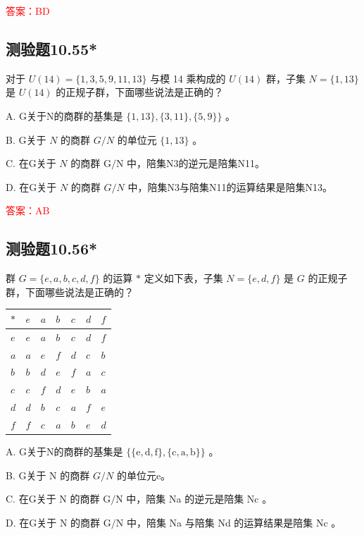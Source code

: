 \documentclass[UTF8, heading=true]{ctexart}
\begin{document}
\textcolor{red}{答案：BD}


\subsection{测验题10.55*}

对于 $U(14)=\{1,3,5,9,11,13\}$ 与模 14 乘构成的 $U(14)$ 群，子集 $N=\{1,13\}$ 是 $U(14)$ 的正规子群，下面哪些说法是正确的？

A. G关于N的商群的基集是 $\{1,13\},\{3,11\},\{5,9\}\}$ 。

B. G关于 $N$ 的商群 $G / N$ 的单位元 $\{1,13\}$ 。

C. 在G关于 $N$ 的商群 $\mathrm{G} / \mathrm{N}$ 中，陪集N3的逆元是陪集N11。

D. 在G关于 $N$ 的商群 $G / N$ 中，陪集N3与陪集N11的运算结果是陪集N13。

\textcolor{red}{答案：AB}

\subsection{测验题10.56*}

群 $G=\{e, a, b, c, d, f\}$ 的运算 $*$ 定义如下表，子集 $N=\{e, d, f\}$ 是 $G$ 的正规子群，下面哪些说法是正确的？

\begin{table}[H]
  \renewcommand{\arraystretch}{1.5}
  \centering
\begin{tabular}{l|llllll}
\hline$*$ & $e$ & $a$ & $b$ & $c$ & $d$ & $f$ \\
\hline$e$ & $e$ & $a$ & $b$ & $c$ & $d$ & $f$ \\
$a$ & $a$ & $e$ & $f$ & $d$ & $c$ & $b$ \\
$b$ & $b$ & $d$ & $e$ & $f$ & $a$ & $c$ \\
$c$ & $c$ & $f$ & $d$ & $e$ & $b$ & $a$ \\
$d$ & $d$ & $b$ & $c$ & $a$ & $f$ & $e$ \\
$f$ & $f$ & $c$ & $a$ & $b$ & $e$ & $d$ \\
\hline
\end{tabular}
\end{table}

A. G关于N的商群的基集是 $\{\{\mathrm{e}, \mathrm{d}, \mathrm{f}\},\{\mathrm{c}, \mathrm{a}, \mathrm{b}\}\}$ 。

B. G关于 N 的商群 $G / N$ 的单位元e。

C. 在G关于 N 的商群 $\mathrm{G} / \mathrm{N}$ 中，陪集 Na 的逆元是陪集 Nc 。

D. 在G关于 N 的商群 $\mathrm{G} / \mathrm{N}$ 中，陪集 Na 与陪集 Nd 的运算结果是陪集 Nc 。
\end{document}
